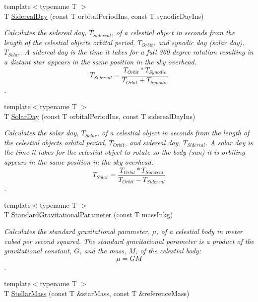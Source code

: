 \begin{DoxyCompactItemize}
{\footnotesize template$<$typename T $>$ }\\T \mbox{\hyperlink{group___e_g_x_phys-_astrophysic-_sidereal_day_ga587900d5fc755228c1bb5121cd7965c6}{Sidereal\+Day}} (const T orbital\+Period\+Ins, const T synodic\+Day\+Ins)
\begin{DoxyCompactList}\small\item\em Calculates the sidereal day, $T_{Sidereal}$, of a celestial object in seconds from the length of the celestial object\textquotesingle{}s orbital period, $T_{Orbit}$, and synodic day (solar day), $T_{Solar}$. A sidereal day is the time it takes for a full 360 degree rotation resulting in a distant star appears in the same position in the sky overhead. \[ T_{Sidereal}=\dfrac{T_{Orbit} * T_{Synodic}}{T_{Orbit} + T_{Synodic}}\]. \end{DoxyCompactList}\item 
{\footnotesize template$<$typename T $>$ }\\T \mbox{\hyperlink{group___e_g_x_phys-_astrophysic-_solar_day_gae321e0dd0c031a57c45b15dc819635e0}{Solar\+Day}} (const T orbital\+Period\+Ins, const T sidereal\+Day\+Ins)
\begin{DoxyCompactList}\small\item\em Calculates the solar day, $T_{Solar}$, of a celestial object in seconds from the length of the celestial object\textquotesingle{}s orbital period, $T_{Orbit}$, and sidereal day, $T_{Sidereal}$. A solar day is the time it takes for the celestial object to rotate so the body (sun) it is orbiting appears in the same position in the sky overhead. \[ T_{Solar}=\dfrac{T_{Orbit} * T_{Sidereal}}{T_{Orbit} - T_{Sidereal}}\]. \end{DoxyCompactList}\item 
{\footnotesize template$<$typename T $>$ }\\T \mbox{\hyperlink{group___e_g_x_phys-_astrophysics-_standard_gravitational_parameter_ga37f4ed78b0fc23603b49ade3e435ea20}{Standard\+Gravitational\+Parameter}} (const T mass\+Inkg)
\begin{DoxyCompactList}\small\item\em Calculates the standard gravitational parameter, $\mu$, of a celestial body in meter cubed per second squared. The standard gravitational parameter is a product of the gravitational constant, $G$, and the mass, $M$, of the celestial body\+: \[\mu = GM\]. \end{DoxyCompactList}\item 
{\footnotesize template$<$typename T $>$ }\\T \mbox{\hyperlink{group___e_g_x_phys-_stellar_mass_gabbd6081cd3bfb0153d7470d58f733a61}{Stellar\+Mass}} (const T \&star\+Mass, const T \&reference\+Mass)

\end{DoxyCompactItemize}
